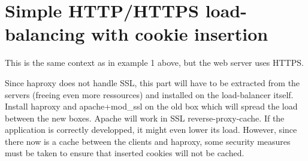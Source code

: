 \section{Simple HTTP/HTTPS load-balancing with cookie insertion}

This is the same context as in example 1 above, but the web
server uses HTTPS.

\begin{figure}[!h]
  \centering

\end{figure}

Since haproxy does not handle SSL, this part will have to be extracted from the
servers (freeing even more ressources) and installed on the load-balancer
itself. Install haproxy and apache+mod\_ssl on the old box which will spread the
load between the new boxes. Apache will work in SSL reverse-proxy-cache. If the
application is correctly developped, it might even lower its load. However,
since there now is a cache between the clients and haproxy, some security
measures must be taken to ensure that inserted cookies will not be cached.

